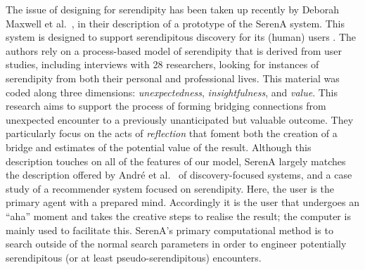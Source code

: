 The issue of designing for serendipity has been taken up recently by
Deborah Maxwell et al.~\citeyear{maxwell2012designing}, in their
description of a prototype of the {\sf SerenA} system.  This system is
designed to support serendipitous discovery for its (human) users
\cite{forth2013serena}.  The authors rely on a process-based model of
serendipity \cite{Makri2012,Makri2012a} that is derived from user
studies, including interviews with 28 researchers, looking for
instances of serendipity from both their personal and professional
lives.  This material was coded along three dimensions:
\emph{unexpectedness}, \emph{insightfulness}, and \emph{value}.  This
research aims to support the process of forming bridging connections
from unexpected encounter to a previously unanticipated but valuable
outcome.  They particularly focus on the acts of \emph{reflection}
that foment both the creation of a bridge and estimates of the
potential value of the result.
%
Although this description touches on all of the features of our model, {\sf
  SerenA} largely matches the description offered by Andr{\'e} et
al.~\citeyear{andre2009discovery} of discovery-focused systems, and a
case study of a recommender system focused on serendipity.  Here, the
user is the primary agent with a prepared mind.  Accordingly it is the
user that undergoes an ``aha'' moment and takes the creative steps to
realise the result; the computer is mainly used to facilitate this.
{\sf SerenA}'s primary computational method is to search outside of
the normal search parameters in order to engineer potentially
serendipitous (or at least pseudo-serendipitous) encounters. 

